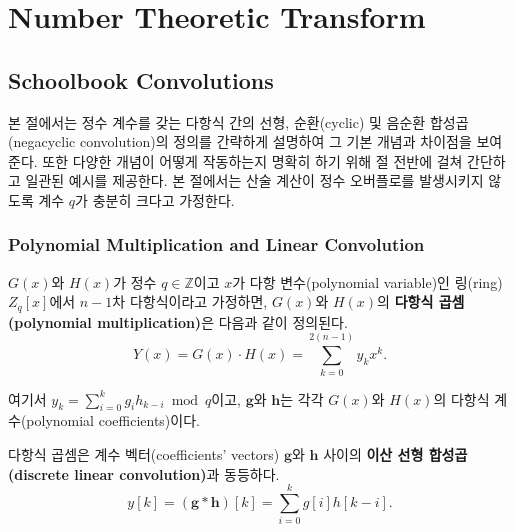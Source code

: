 \chapter{Number Theoretic Transform}

\section{Schoolbook Convolutions}

본 절에서는 정수 계수를 갖는 다항식 간의 선형, 순환(cyclic) 및 음순환 합성곱(negacyclic convolution)의 정의를 간략하게 설명하여 그 기본 개념과 차이점을 보여준다. 또한 다양한 개념이 어떻게 작동하는지 명확히 하기 위해 절 전반에 걸쳐 간단하고 일관된 예시를 제공한다. 본 절에서는 산술 계산이 정수 오버플로를 발생시키지 않도록 계수 $q$가 충분히 크다고 가정한다.

\subsection{Polynomial Multiplication and Linear Convolution}

\begin{tcolorbox}[colback=white, boxrule=0.7pt, sharp corners]
\begin{definition}
$G(x)$와 $H(x)$가 정수 $q \in \mathbb{Z}$이고 $x$가 다항 변수(polynomial variable)인 링(ring) $Z_q[x]$에서 $n-1$차 다항식이라고 가정하면, $G(x)$와 $H(x)$의 \textbf{다항식 곱셈(polynomial multiplication)}은 다음과 같이 정의된다.
\begin{equation}
Y(x) = G(x) \cdot H(x) = \sum_{k=0}^{2(n-1)} y_k x^k.
\end{equation}

여기서 $y_k = \sum_{i=0}^k g_i h_{k-i} \bmod q$이고, $\mathbf{g}$와 $\mathbf{h}$는 각각 $G(x)$와 $H(x)$의 다항식 계수(polynomial coefficients)이다.
\end{definition}
\end{tcolorbox}

다항식 곱셈은 계수 벡터(coefficients' vectors) $\mathbf{g}$와 $\mathbf{h}$ 사이의 \textbf{이산 선형 합성곱(discrete linear convolution)}과 동등하다.
\begin{equation}
y[k] = (\mathbf{g} * \mathbf{h})[k] = \sum_{i=0}^k g[i]h[k-i].
\end{equation}


